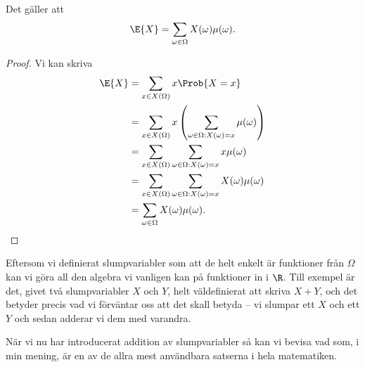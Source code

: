 \documentclass[nobib]{tufte-handout}
\begin{document}
\begin{lemma}\label{lemma_expectation_as_sum_over_omegas}
    Det gäller att
    $$\E{X} = \sum_{\omega \in \Omega} X(\omega)\mu(\omega).$$

    \begin{proof}
        Vi kan skriva
        \begin{align*}
            \E{X} &= \sum_{x \in X(\Omega)} x \Prob{X = x}\\
            &= \sum_{x \in X(\Omega)} x\left(\sum_{\omega \in \Omega: X(\omega) = x} \mu(\omega)\right)\\
            &= \sum_{x \in X(\Omega)} \sum_{\omega \in \Omega: X(\omega) = x} x\mu(\omega)\\
            &= \sum_{x \in X(\Omega)} \sum_{\omega \in \Omega: X(\omega) = x} X(\omega)\mu(\omega)\\
            &= \sum_{\omega \in \Omega} X(\omega)\mu(\omega).
        \end{align*}
    \end{proof}
\end{lemma}

Eftersom vi definierat slumpvariabler som att de helt enkelt är funktioner från $\Omega$ kan vi göra all den algebra vi vanligen kan på funktioner in i $\R$. Till exempel är det, givet två slumpvariabler $X$ och $Y$, helt väldefinierat att skriva $X + Y$, och det betyder precis vad vi förväntar oss att det skall betyda -- vi slumpar ett $X$ och ett $Y$ och sedan adderar vi dem med varandra.

När vi nu har introducerat addition av slumpvariabler så kan vi bevisa vad som, i min mening, är en av de allra mest användbara satserna i hela matematiken.
\end{document}
